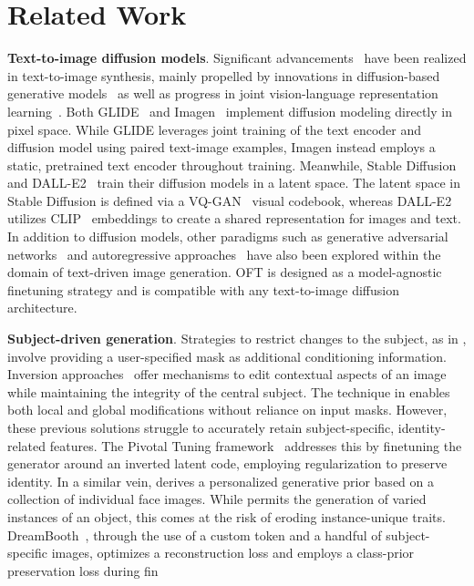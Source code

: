 \section{Related Work}

\textbf{Text-to-image diffusion models}. Significant advancements~\cite{saharia2022photorealistic,ramesh2022hierarchical,rombach2022high,gu2022vector,nichol2022glide} have been realized in text-to-image synthesis, mainly propelled by innovations in diffusion-based generative models~\cite{ho2020denoising,song2021score,song2021denoising,dhariwal2021diffusion} as well as progress in joint vision-language representation learning~\cite{su2020vlbert,lu2019vilbert,radford2021learning,wang2021simvlm,li2022blip,li2023blip,alayrac2022flamingo,schuhmann2022laion}. Both GLIDE~\cite{nichol2022glide} and Imagen~\cite{saharia2022photorealistic} implement diffusion modeling directly in pixel space. While GLIDE leverages joint training of the text encoder and diffusion model using paired text-image examples, Imagen instead employs a static, pretrained text encoder throughout training. Meanwhile, Stable Diffusion~\cite{rombach2022high} and DALL-E2~\cite{ramesh2022hierarchical} train their diffusion models in a latent space. The latent space in Stable Diffusion is defined via a VQ-GAN~\cite{esser2021taming} visual codebook, whereas DALL-E2 utilizes CLIP~\cite{radford2021learning} embeddings to create a shared representation for images and text. In addition to diffusion models, other paradigms such as generative adversarial networks~\cite{reed2016generative,zhang2017stackgan,xu2018attngan,li2019controllable} and autoregressive approaches~\cite{ramesh2021zero,ding2021cogview,wu2022nuwa,yuscaling} have also been explored within the domain of text-driven image generation. OFT is designed as a model-agnostic finetuning strategy and is compatible with any text-to-image diffusion architecture.

\textbf{Subject-driven generation}. Strategies to restrict changes to the subject, as in \cite{avrahami2022blended,nichol2022glide}, involve providing a user-specified mask as additional conditioning information. Inversion approaches~\cite{choi2021ilvr,dhariwal2021diffusion,ramesh2022hierarchical,gal2022image} offer mechanisms to edit contextual aspects of an image while maintaining the integrity of the central subject. The technique in \cite{hertz2022prompt} enables both local and global modifications without reliance on input masks. However, these previous solutions struggle to accurately retain subject-specific, identity-related features. The Pivotal Tuning framework~\cite{roich2022pivotal} addresses this by finetuning the generator around an inverted latent code, employing regularization to preserve identity. In a similar vein, \cite{nitzan2022mystyle} derives a personalized generative prior based on a collection of individual face images. While \cite{casanova2021instance} permits the generation of varied instances of an object, this comes at the risk of eroding instance-unique traits. DreamBooth~\cite{ruiz2023dreambooth}, through the use of a custom token and a handful of subject-specific images, optimizes a reconstruction loss and employs a class-prior preservation loss during fin

